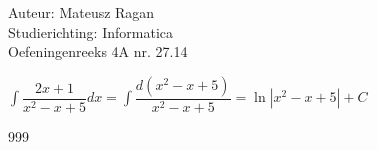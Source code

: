 \documentclass[a4paper]{article}
\begin{document}
\noindent \large Auteur: Mateusz Ragan \\
\noindent \large Studierichting: Informatica\\
\noindent \large Oefeningenreeks 4A nr. 27.14\\

\medskip

\normalsize

$\displaystyle\int \dfrac{2x+1}{x^2-x+5}dx = \displaystyle\int \dfrac{d(x^2-x+5)}{x^2-x+5} = \ln |x^2-x+5| + C$

\begin{thebibliography}{999}
\end{thebibliography}
\end{document}
